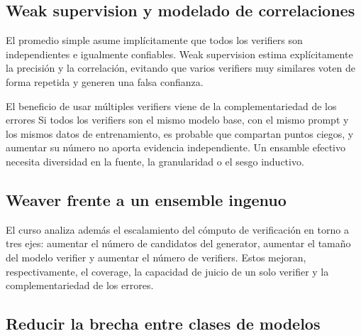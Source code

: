 \subsection{Weak supervision y modelado de correlaciones}

El promedio simple asume implícitamente que todos los verifiers son independientes e igualmente confiables. Weak supervision estima explícitamente la precisión y la correlación, evitando que varios verifiers muy similares voten de forma repetida y generen una falsa confianza.


\begin{importantbox}{El beneficio de usar múltiples verifiers viene de la complementariedad de los errores}
Si todos los verifiers son el mismo modelo base, con el mismo prompt y los mismos datos de entrenamiento, es probable que compartan puntos ciegos, y aumentar su número no aporta evidencia independiente. Un ensamble efectivo necesita diversidad en la fuente, la granularidad o el sesgo inductivo.
\end{importantbox}

\subsection{Weaver frente a un ensemble ingenuo}


El curso analiza además el escalamiento del cómputo de verificación en torno a tres ejes: aumentar el número de candidatos del generator, aumentar el tamaño del modelo verifier y aumentar el número de verifiers. Estos mejoran, respectivamente, el coverage, la capacidad de juicio de un solo verifier y la complementariedad de los errores.


\subsection{Reducir la brecha entre clases de modelos}

